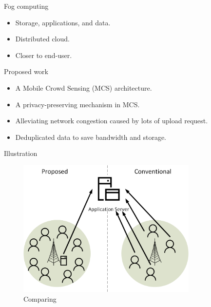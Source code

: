 \documentclass{beamer}
\begin{document}
\begin{frame}{Fog computing}
    \begin{itemize}
        \item {Storage, applications, and data.}
        \item {Distributed cloud.}
        \item {Closer to end-user.}
    \end{itemize}
\end{frame}
\begin{frame}{Proposed work}
    \begin{itemize}
        \item {A Mobile Crowd Sensing (MCS) architecture.}
        \item {A privacy-preserving mechanism in MCS.}
        \item {Alleviating network congestion caused by lots of upload request.}
        \item {Deduplicated data to save bandwidth and storage.}
    \end{itemize}
\end{frame}
\begin{frame}{Illustration}
    \begin{figure}[t]
        \centering
        \includegraphics[width=0.8\textwidth]{figures/6.png}
        \caption{Comparing}
    \end{figure}
\end{frame}
\end{document}
